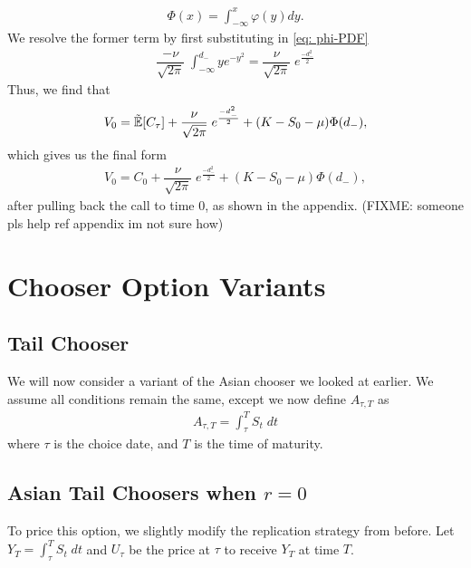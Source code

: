 \documentclass[reqno]{amsart}
\begin{document}
\begin{align} \label{eq: cdfnormal}
     \Phi(x) = \int_{-\infty}^x \varphi(y) dy.
\end{align}
We resolve the former term by first substituting in \eqref{eq: phi-PDF}
\begin{align}
     \dfrac{-\nu}{\sqrt{2\pi}} \;\int_{-\infty}^{d_{-}} ye^{-y^2} = \dfrac{\nu}{\sqrt{2\pi}} \;e^{\frac{-d_-^2}{2}}
\end{align}
Thus, we find that
\begin{align}
     V_0 = \tilde{\mathbb{E}}[C_\tau] + \dfrac{\nu}{\sqrt{2\pi}} \;e^{\frac{-d_-^2}{2}} +  (K- S_0 - \mu) \Phi(d_-),
\end{align}
which gives us the final form 
\begin{align}
     V_0 = C_0 + \dfrac{\nu}{\sqrt{2\pi}} \;e^{\frac{-d_-^2}{2}} +  (K- S_0 - \mu) \Phi(d_-),
\end{align}
after pulling back the call to time 0, as shown in the appendix. (FIXME: someone pls help ref appendix im not sure how)

\section{Chooser Option Variants}

\subsection{Tail Chooser}
We will now consider a variant of the Asian chooser we looked at earlier. We assume all conditions remain the same, except we now define $A_{\tau, T}$ as
\begin{align}
     A_{\tau, T} = \int_\tau^T S_t \;dt
\end{align}
where $\tau$ is the choice date, and $T$ is the time of maturity.

\subsection{Asian Tail Choosers when $r = 0$}
To price this option, we slightly modify the replication strategy from before. Let $Y_T = \int_\tau^T S_t \;dt$ and $U_\tau$ be the price at $\tau$ to receive $Y_T$ at time $T$.
\end{document}
